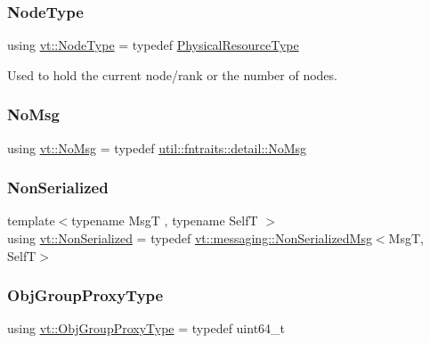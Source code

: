 \subsubsection{\texorpdfstring{Node\+Type}{NodeType}}
{\footnotesize\ttfamily using \hyperlink{namespacevt_a866da9d0efc19c0a1ce79e9e492f47e2}{vt\+::\+Node\+Type} = typedef \hyperlink{namespacevt_a2dc36fcada816dc6d11774d650328ee9}{Physical\+Resource\+Type}}



Used to hold the current node/rank or the number of nodes. 

\mbox{\label{namespacevt_af7c7e4af1ee59911bd84482b2332c736}} 
\subsubsection{\texorpdfstring{No\+Msg}{NoMsg}}
{\footnotesize\ttfamily using \hyperlink{namespacevt_af7c7e4af1ee59911bd84482b2332c736}{vt\+::\+No\+Msg} = typedef \hyperlink{structvt_1_1util_1_1fntraits_1_1detail_1_1_no_msg}{util\+::fntraits\+::detail\+::\+No\+Msg}}

\mbox{\label{namespacevt_a378e4a02213923b4ba1c3f9d2a1424c7}} 
\subsubsection{\texorpdfstring{Non\+Serialized}{NonSerialized}}
{\footnotesize\ttfamily template$<$typename MsgT , typename SelfT $>$ \\
using \hyperlink{namespacevt_a378e4a02213923b4ba1c3f9d2a1424c7}{vt\+::\+Non\+Serialized} = typedef \hyperlink{structvt_1_1messaging_1_1_non_serialized_msg}{vt\+::messaging\+::\+Non\+Serialized\+Msg}$<$MsgT, SelfT$>$}

\mbox{\label{namespacevt_ad7cae989df485fccca57f0792a880a8e}} 
\subsubsection{\texorpdfstring{Obj\+Group\+Proxy\+Type}{ObjGroupProxyType}}
{\footnotesize\ttfamily using \hyperlink{namespacevt_ad7cae989df485fccca57f0792a880a8e}{vt\+::\+Obj\+Group\+Proxy\+Type} = typedef uint64\+\_\+t}



